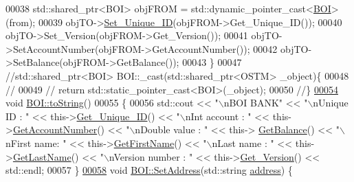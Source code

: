 \begin{DoxyCode}
00038     std::shared\_ptr<BOI> objFROM = std::dynamic\_pointer\_cast<\hyperlink{class_b_o_i}{BOI}>(from);
00039     objTO->\hyperlink{class_o_s_t_m_ab5019a32185631c08abbf826422f2d93_ab5019a32185631c08abbf826422f2d93}{Set\_Unique\_ID}(objFROM->Get\_Unique\_ID());
00040     objTO->Set\_Version(objFROM->Get\_Version());
00041     objTO->SetAccountNumber(objFROM->GetAccountNumber());
00042     objTO->SetBalance(objFROM->GetBalance());
00043 \}
00047 \textcolor{comment}{//std::shared\_ptr<BOI> BOI::\_cast(std::shared\_ptr<OSTM> \_object)\{}
00048 \textcolor{comment}{//}
00049 \textcolor{comment}{//    return std::static\_pointer\_cast<BOI>(\_object);}
00050 \textcolor{comment}{//\}}
\hypertarget{_b_o_i_8cpp_source.tex_l00054}{}\hyperlink{class_b_o_i_ab02a4dd4ebcc5b2abfaca19f2dff2006_ab02a4dd4ebcc5b2abfaca19f2dff2006}{00054} \textcolor{comment}{}\textcolor{keywordtype}{void} \hyperlink{class_b_o_i_ab02a4dd4ebcc5b2abfaca19f2dff2006_ab02a4dd4ebcc5b2abfaca19f2dff2006}{BOI::toString}()
00055 \{
00056    std::cout << \textcolor{stringliteral}{"\(\backslash\)nBOI BANK"} << \textcolor{stringliteral}{"\(\backslash\)nUnique ID : "} << this->\hyperlink{class_o_s_t_m_a5a01a8b98d16b1d1904ecf9356e7b71d_a5a01a8b98d16b1d1904ecf9356e7b71d}{Get\_Unique\_ID}() << \textcolor{stringliteral}{"\(\backslash\)nInt account : 
      "} << this->\hyperlink{class_b_o_i_a5b18e1538f3d37835234946cdf9f240f_a5b18e1538f3d37835234946cdf9f240f}{GetAccountNumber}() << \textcolor{stringliteral}{"\(\backslash\)nDouble value : "} << this->
      \hyperlink{class_b_o_i_a25b289dece2a1685bb9d1a9332c9be0b_a25b289dece2a1685bb9d1a9332c9be0b}{GetBalance}() << \textcolor{stringliteral}{"\(\backslash\)nFirst name: "} << this->\hyperlink{class_b_o_i_ab4b9d50c6008a666aa4382def580e7d1_ab4b9d50c6008a666aa4382def580e7d1}{GetFirstName}() << \textcolor{stringliteral}{"\(\backslash\)nLast name : "} << 
      this->\hyperlink{class_b_o_i_a37828f3fa4a32f522966e2cad90eaab2_a37828f3fa4a32f522966e2cad90eaab2}{GetLastName}()  << \textcolor{stringliteral}{"\(\backslash\)nVersion number : "} << this->\hyperlink{class_o_s_t_m_a1f1db9d482f22c8e7caa17dfb340626b_a1f1db9d482f22c8e7caa17dfb340626b}{Get\_Version}() << std::endl;
00057 \}
\hypertarget{_b_o_i_8cpp_source.tex_l00058}{}\hyperlink{class_b_o_i_a00c9386c862cf2442968bf7fc30102b3_a00c9386c862cf2442968bf7fc30102b3}{00058} \textcolor{keywordtype}{void} \hyperlink{class_b_o_i_a00c9386c862cf2442968bf7fc30102b3_a00c9386c862cf2442968bf7fc30102b3}{BOI::SetAddress}(std::string \hyperlink{class_b_o_i_ab9315fe76fd9f07551f5ae7899d33516_ab9315fe76fd9f07551f5ae7899d33516}{address}) \{

\end{DoxyCode}

